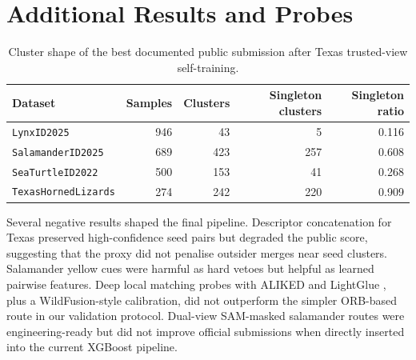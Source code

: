 \documentclass{ceurart}
\newcommand{\dataset}[1]{\texttt{#1}}
\begin{document}
\section{Additional Results and Probes}
\label{app:additional-results}
\begin{table}[h]
  \centering
  \caption{Cluster shape of the best documented public submission after Texas trusted-view self-training.}
  \label{tab:cluster-shape}
  \begin{tabular}{lrrrr}
    \toprule
    Dataset & Samples & Clusters & Singleton clusters & Singleton ratio \\
    \midrule
    \dataset{LynxID2025} & 946 & 43 & 5 & 0.116 \\
    \dataset{SalamanderID2025} & 689 & 423 & 257 & 0.608 \\
    \dataset{SeaTurtleID2022} & 500 & 153 & 41 & 0.268 \\
    \dataset{TexasHornedLizards} & 274 & 242 & 220 & 0.909 \\
    \bottomrule
  \end{tabular}
\end{table}

Several negative results shaped the final pipeline. Descriptor concatenation for Texas preserved high-confidence seed pairs but degraded the public score, suggesting that the proxy did not penalise outsider merges near seed clusters. Salamander yellow cues were harmful as hard vetoes but helpful as learned pairwise features. Deep local matching probes with ALIKED \cite{aliked} and LightGlue \cite{lightglue}, plus a WildFusion-style calibration, did not outperform the simpler ORB-based route in our validation protocol. Dual-view SAM-masked salamander routes were engineering-ready but did not improve official submissions when directly inserted into the current XGBoost pipeline.


\end{document}
